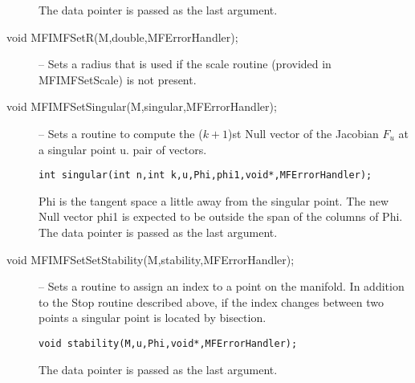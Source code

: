 \documentclass[12pt]{article}
\begin{document}
\begin{description}
\begin{verbatim}
\end{verbatim}
The data pointer is passed as the last argument.
\item [void MFIMFSetR(M,double,MFErrorHandler);]
-- Sets a radius that is used if the scale routine (provided in MFIMFSetScale) is not present.
\item [void MFIMFSetSingular(M,singular,MFErrorHandler);]
-- Sets a routine to compute the ($k+1$)st Null vector of the Jacobian $F_u$ at a singular point u.
pair of vectors.
\begin{verbatim}
int singular(int n,int k,u,Phi,phi1,void*,MFErrorHandler);
\end{verbatim}
Phi is the tangent space a little away from the singular point. The new Null vector phi1 is expected to 
be outside the span of the columns of Phi.
The data pointer is passed as the last argument.
\item [void MFIMFSetSetStability(M,stability,MFErrorHandler);]
-- Sets a routine to assign an index to a point on the manifold. In addition to the Stop routine described above, 
if the index changes between two points a singular point is located by bisection.
\begin{verbatim}
void stability(M,u,Phi,void*,MFErrorHandler);
\end{verbatim}
The data pointer is passed as the last argument.
\end{description}
\end{document}

